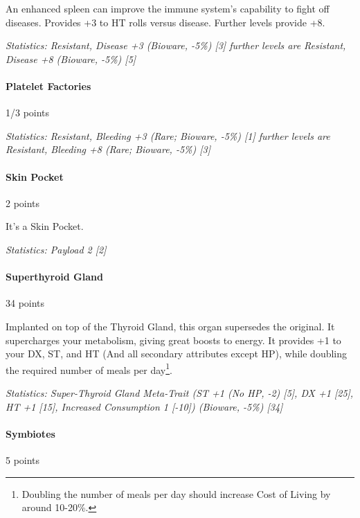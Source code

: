 \begin{multicols*}{3}
	An enhanced spleen can improve the immune system's capability to fight off diseases. Provides +3 to HT rolls versus disease.  Further levels provide +8.
	
	\textit{\textcolor{OliveGreen}{Statistics: Resistant, Disease +3 (Bioware, -5\%) [3] further levels are Resistant, Disease +8 (Bioware, -5\%) [5]}}
	
	\paragraph{Platelet Factories}
	\begin{flushright}
		1/3 points
	\end{flushright}
	
	\textit{\textcolor{OliveGreen}{Statistics: Resistant, Bleeding +3 (Rare; Bioware, -5\%) [1] further levels are Resistant, Bleeding +8 (Rare; Bioware, -5\%) [3]}}
	
	\paragraph{Skin Pocket}\label{skin_pocket}
	\begin{flushright}
		2 points
	\end{flushright}
	
	It's a Skin Pocket. 
	
	\textit{\textcolor{OliveGreen}{Statistics: Payload 2 [2]}}
	
	\paragraph{Superthyroid Gland}
	\begin{flushright}
		34 points
	\end{flushright}
	
	Implanted on top of the Thyroid Gland, this organ supersedes the original. It supercharges your metabolism, giving great boosts to energy. It provides +1 to your DX, ST, and HT (And all secondary attributes except HP), while doubling the required number of meals per day\footnote{Doubling the number of meals per day should increase Cost of Living by around 10-20\%.}.
	
	\textit{\textcolor{OliveGreen}{Statistics: Super-Thyroid Gland Meta-Trait (ST +1 (No HP, -2) [5], DX +1 [25], HT +1 [15], Increased Consumption 1 [-10]) (Bioware, -5\%) [34]}}
	
	\paragraph{Symbiotes}
	\begin{flushright}
		5 points
	\end{flushright}
	

\end{multicols*}
